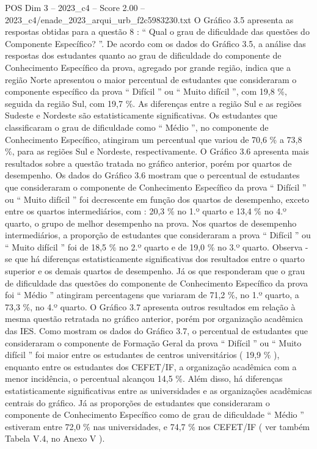 \begin{textsample}{POS Dim 3 – 2023\_c4 – Score 2.00 – 2023\_c4/enade\_2023\_arqui\_urb\_f2c5983230.txt}
O Gráfico 3.5 apresenta as respostas obtidas para a questão 8 : “ Qual o grau de dificuldade das questões do Componente Específico? ”.
De acordo com os dados do Gráfico 3.5, a análise das respostas dos estudantes quanto ao grau de dificuldade do componente de Conhecimento Específico da prova, agregado por grande região, indica que a região Norte apresentou o maior percentual de estudantes que consideraram o componente específico da prova “ Difícil ” ou “ Muito difícil ”, com 19,8 \%, seguida da região Sul, com 19,7 \%.
As diferenças entre a região Sul e as regiões Sudeste e Nordeste são estatisticamente significativas.
Os estudantes que classificaram o grau de dificuldade como “ Médio ”, no componente de Conhecimento Específico, atingiram um percentual que variou de 70,6 \% a 73,8 \%, para as regiões Sul e Nordeste, respectivamente.
O Gráfico 3.6 apresenta mais resultados sobre a questão tratada no gráfico anterior, porém por quartos de desempenho.
Os dados do Gráfico 3.6 mostram que o percentual de estudantes que consideraram o componente de Conhecimento Específico da prova “ Difícil ” ou “ Muito difícil ” foi decrescente em função dos quartos de desempenho, exceto entre os quartos intermediários, com : 20,3 \% no 1.º quarto e 13,4 \% no 4.º quarto, o grupo de melhor desempenho na prova.
Nos quartos de desempenho intermediários, a proporção de estudantes que consideraram a prova “ Difícil ” ou “ Muito difícil ” foi de 18,5 \% no 2.º quarto e de 19,0 \% no 3.º quarto.
Observa -se que há diferenças estatisticamente significativas dos resultados entre o quarto superior e os demais quartos de desempenho.
Já os que responderam que o grau de dificuldade das questões do componente de Conhecimento Específico da prova foi “ Médio ” atingiram percentagens que variaram de 71,2 \%, no 1.º quarto, a 73,3 \%, no 4.º quarto.
O Gráfico 3.7 apresenta outros resultados em relação à mesma questão retratada no gráfico anterior, porém por organização acadêmica das IES.
Como mostram os dados do Gráfico 3.7, o percentual de estudantes que consideraram o componente de Formação Geral da prova “ Difícil ” ou “ Muito difícil ” foi maior entre os estudantes de centros universitários ( 19,9 \% ), enquanto entre os estudantes dos CEFET/IF, a organização acadêmica com a menor incidência, o percentual alcançou 14,5 \%.
Além disso, há diferenças estatisticamente significativas entre as universidades e as organizações acadêmicas centrais do gráfico.
Já as proporções de estudantes que consideraram o componente de Conhecimento Específico como de grau de dificuldade “ Médio ” estiveram entre 72,0 \% nas universidades, e 74,7 \% nos CEFET/IF ( ver também Tabela V.4, no Anexo V ).

\end{textsample}
